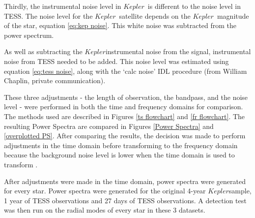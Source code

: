 \documentclass[a4paper,fleqn,usenatbib,useAMS]{mnras}
\newcommand{\kep}{\ensuremath{Kepler}\:}
\begin{document}
Thirdly, the instrumental noise level in \kep \ is different to the noise level in TESS. The noise level for the \kep \ satellite depends on the \kep \ magnitude of the star, equation \ref{eq:kep noise}. This white noise was subtracted from the power spectrum.

As well as subtracting the \kep instrumental noise from the signal, instrumental noise from TESS needed to be added. This noise level was estimated using equation \ref{eq:tess noise}, along with the `calc noise' IDL procedure (from William Chaplin, private communication).

These three adjustments - the length of observation, the bandpass, and the noise level - were performed in both the time and frequency domains for comparison. The methods used are described in Figures \ref{ts flowchart} and \ref{fr flowchart}. The resulting Power Spectra are compared in Figures \ref{Power Spectra} and \ref{overplotted PS}. After comparing the results, the decision was made to perform adjustments in the time domain before transforming to the frequency domain because the background noise level is lower when the time domain is used to transform . 

After adjustments were made in the time domain, power spectra were generated for every star. Power spectra were generated for the original 4-year \kep sample, 1 year of TESS observations and 27 days of TESS observations. A detection test was then run on the radial modes of every star in these 3 datasets. 
\end{document}
